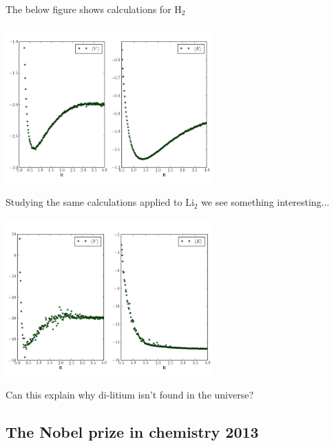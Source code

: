 \documentclass[
paper=128mm:96mm, %
fontsize=11pt, %
pagesize, %
parskip=half-, %
]{scrartcl} %
\theoremstyle{mythmstyle} %
\begin{document}
\clearpage


The below figure shows calculations for $\mathrm{H}_2$

\begin{center}
 \includegraphics[width=0.6\textwidth]{R_vs_E_hyd_pure}
\end{center}


\clearpage

Studying the same calculations applied to $\mathrm{Li}_2$ we see something interesting...

\begin{center}
 \includegraphics[width=0.6\textwidth]{R_vs_E_lit_pure}
\end{center}

\clearpage

Can this explain why di-litium isn't found in the universe?

\clearpage

\subsection{The Nobel prize in chemistry 2013}

\clearpage
\end{document}
